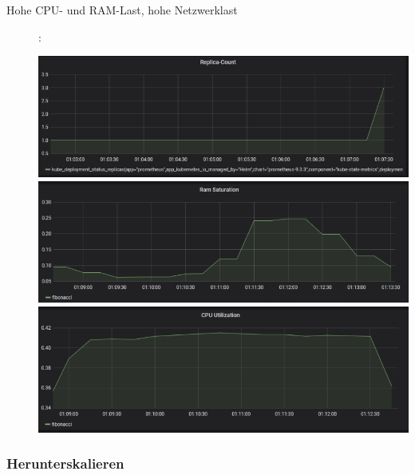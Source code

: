 \documentclass[a4paper,10pt]{scrartcl}
\begin{document}
\begin{description}
\pagebreak

\item[Hohe CPU- und RAM-Last, hohe Netzwerklast]:\\
\begin{minipage}{\linewidth}
            \includegraphics[width=.5\textwidth]{img/RAMCPUSkalierung/Replica-Count-Cut.PNG}
            \includegraphics[scale=1,width=.5\textwidth,height=.14\textheight]{img/RAMCPUSkalierung/RAMSaturation.PNG}
  			\includegraphics[scale=1,width=.5\textwidth]{img/RAMCPUSkalierung/CPUUtilization.PNG}
\end{minipage}

\end{description}

\pagebreak

\subsubsection{Herunterskalieren}
\end{document}
